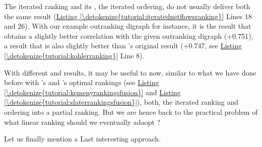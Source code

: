 \documentclass[a4paper,12pt,english]{sphinxhowto}
\begin{document}
The iterated  ranking and its , the iterated  ordering, do not usually deliver both the same result (\hyperref[\detokenize{tutorial:iteratednetflowsranking}]{Listing \ref{\detokenize{tutorial:iteratednetflowsranking}}} Lines 18 and 26). With our example outranking digraph  for instance, it is the  result that obtains a slightly better correlation with the given outranking digraph  (+0.751), a result that is also slightly better than ’s original result (+0.747, see \hyperref[\detokenize{tutorial:kohlerranking}]{Listing \ref{\detokenize{tutorial:kohlerranking}}} Line 8).

With different  and  results, it may be useful to  now, similar to what we have done before with ’s and ’s optimal rankings (see \hyperref[\detokenize{tutorial:kemenyrankingsfusion}]{Listing \ref{\detokenize{tutorial:kemenyrankingsfusion}}} and \hyperref[\detokenize{tutorial:slaterrankingsfusion}]{Listing \ref{\detokenize{tutorial:slaterrankingsfusion}}}), both, the iterated  ranking and ordering into a partial ranking. But we are hence back to the practical problem of what linear ranking should we eventually adaopt ?

Let us finally mention a Last interesting  approach.
\end{document}
